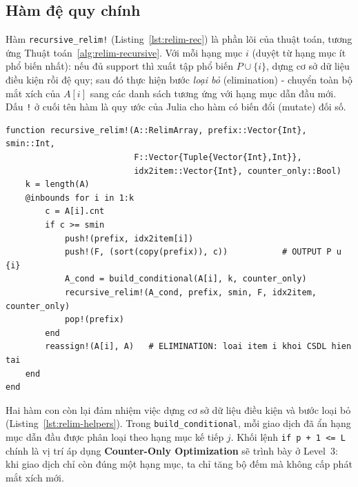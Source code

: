 \documentclass[12pt,a4paper]{report}
\begin{document}
\subsection{Hàm đệ quy chính}

Hàm \texttt{recursive\_relim!} (Listing~\ref{lst:relim-rec}) là phần lõi của
thuật toán, tương ứng Thuật toán~\ref{alg:relim-recursive}. Với mỗi hạng mục $i$
(duyệt từ hạng mục ít phổ biến nhất): nếu đủ support thì xuất tập phổ biến
$P \cup \{i\}$, dựng cơ sở dữ liệu điều kiện rồi đệ quy; sau đó thực hiện bước
\emph{loại bỏ} (elimination) - chuyển toàn bộ mắt xích của $A[i]$ sang các danh
sách tương ứng với hạng mục dẫn đầu mới. Dấu \texttt{!} ở cuối tên hàm là quy
ước của Julia cho hàm có biến đổi (mutate) đối số.

\begin{lstlisting}[style=julia, caption={Hàm đệ quy \texttt{recursive\_relim!} (relim.jl)},
                   label={lst:relim-rec}]
function recursive_relim!(A::RelimArray, prefix::Vector{Int}, smin::Int,
                          F::Vector{Tuple{Vector{Int},Int}},
                          idx2item::Vector{Int}, counter_only::Bool)
    k = length(A)
    @inbounds for i in 1:k
        c = A[i].cnt
        if c >= smin
            push!(prefix, idx2item[i])
            push!(F, (sort(copy(prefix)), c))           # OUTPUT P u {i}
            A_cond = build_conditional(A[i], k, counter_only)
            recursive_relim!(A_cond, prefix, smin, F, idx2item, counter_only)
            pop!(prefix)
        end
        reassign!(A[i], A)   # ELIMINATION: loai item i khoi CSDL hien tai
    end
end
\end{lstlisting}

Hai hàm con còn lại đảm nhiệm việc dựng cơ sở dữ liệu điều kiện và bước loại bỏ
(Listing~\ref{lst:relim-helpers}). Trong \texttt{build\_conditional}, mỗi giao
dịch đã ẩn hạng mục dẫn đầu được phân loại theo hạng mục kế tiếp $j$. Khối lệnh
\texttt{if p + 1 <= L} chính là vị trí áp dụng \textbf{Counter-Only
Optimization} sẽ trình bày ở Level~3: khi giao dịch chỉ còn đúng một hạng mục,
ta chỉ tăng bộ đếm mà không cấp phát mắt xích mới.
\end{document}
